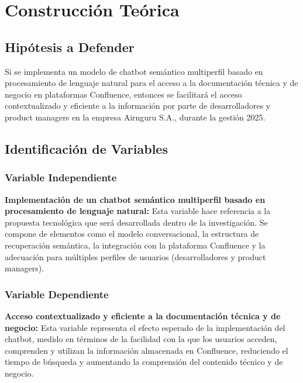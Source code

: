 \chapter{Construcción Teórica}
\section{Hipótesis a Defender}

Si se implementa un modelo de chatbot semántico multiperfil basado en procesamiento de lenguaje natural para el acceso a la documentación técnica y de negocio en plataformas Confluence, entonces se facilitará el acceso contextualizado y eficiente a la información por parte de desarrolladores y product managers en la empresa Airnguru S.A., durante la gestión 2025.

\section{Identificación de Variables}

\subsection{Variable Independiente}
\textbf{Implementación de un chatbot semántico multiperfil basado en procesamiento de lenguaje natural: }Esta variable hace referencia a la propuesta tecnológica que será desarrollada dentro de la investigación. Se compone de elementos como el modelo conversacional, la estructura de recuperación semántica, la integración con la plataforma Confluence y la adecuación para múltiples perfiles de usuarios (desarrolladores y product managers).

\subsection{Variable Dependiente}
\textbf{Acceso contextualizado y eficiente a la documentación técnica y de negocio: }Esta variable representa el efecto esperado de la implementación del chatbot, medido en términos de la facilidad con la que los usuarios acceden, comprenden y utilizan la información almacenada en Confluence, reduciendo el tiempo de búsqueda y aumentando la comprensión del contenido técnico y de negocio.
